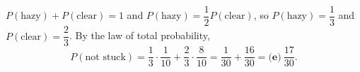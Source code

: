 $P(\text{hazy})+P(\text{clear})=1$ and $P(\text{hazy})=\dfrac{1}{2}P(\text{clear})$, so $P(\text{hazy})=\dfrac{1}{3}$ and $P(\text{clear})=\dfrac{2}{3}$. By the law of total probability,
\[
P(\text{not stuck})=\dfrac{1}{3}\cdot\dfrac{1}{10}+\dfrac{2}{3}\cdot\dfrac{8}{10}=\dfrac{1}{30}+\dfrac{16}{30}=\boxed{\textbf{(e)}\ \dfrac{17}{30}} .
\]
